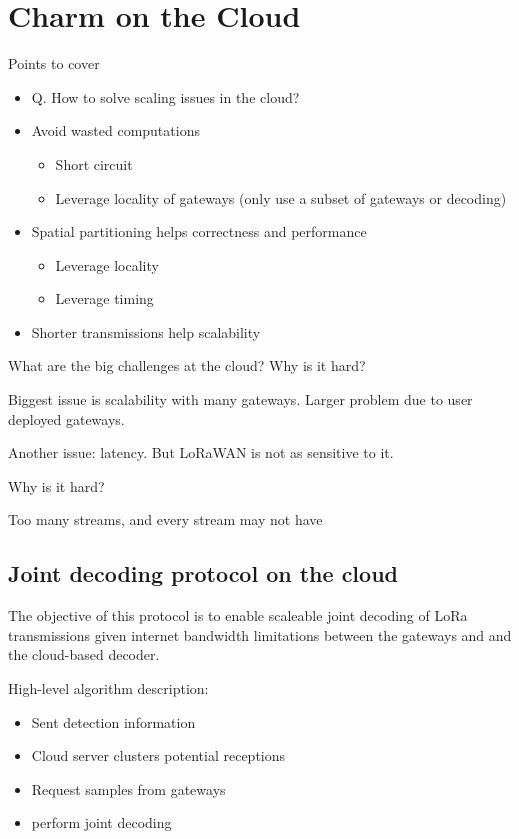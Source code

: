 \section{Charm on the Cloud}
\label{sec:cloud}

{\color{blue}
Points to cover
\begin{itemize} 
    \item Q. How to solve scaling issues in the cloud?
    \item Avoid wasted computations
        \begin{itemize}
            \item Short circuit
            \item Leverage locality of gateways (only use a subset of gateways  or decoding)
        \end{itemize}
    \item Spatial partitioning helps correctness and performance
        \begin{itemize}
            \item Leverage locality
            \item Leverage timing
        \end{itemize}
    \item Shorter transmissions help scalability
\end{itemize}
}

What are the big challenges at the cloud? Why is it hard?

Biggest issue is scalability with many gateways. Larger problem due to user deployed gateways.

Another issue: latency. But LoRaWAN is not as sensitive to it.

Why is it hard?

Too many streams, and every stream may not have 

\subsection{Joint decoding protocol on the cloud}
\label{sec:joint-decoding-cloud}


The objective of this protocol is to enable scaleable joint decoding of LoRa
transmissions given internet bandwidth limitations between the gateways and
and the cloud-based decoder.

{\color{blue} High-level algorithm description:
\begin{itemize}
    \item Sent detection information
    \item Cloud server clusters potential receptions
    \item Request samples from gateways
    \item perform joint decoding
\end{itemize}
}